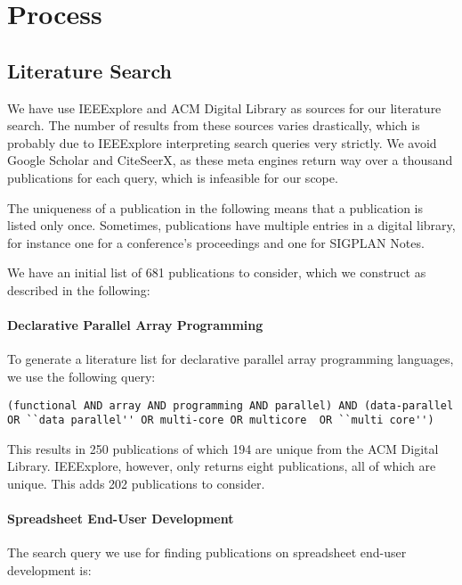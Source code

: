 \documentclass[a4paper]{article}
\begin{document}
\section{Process}
\label{sec:process}

\subsection{Literature Search}
\label{sec:literature-search}

We have use IEEExplore and ACM Digital Library as sources for our
literature search. The number of results from these sources varies
drastically, which is probably due to IEEExplore interpreting search
queries very strictly. We avoid Google Scholar and CiteSeerX, as these
meta engines return way over a thousand publications for each query,
which is infeasible for our scope.

The uniqueness of a publication in the following means that a
publication is listed only once. Sometimes, publications have multiple
entries in a digital library, for instance one for a conference's
proceedings and one for SIGPLAN Notes.

We have an initial list of 681 publications to consider, which we
construct as described in the following:

\paragraph{Declarative Parallel Array Programming}

To generate a literature list for declarative parallel array
programming languages, we use the following query:

\begin{lstlisting}
(functional AND array AND programming AND parallel) AND (data-parallel OR ``data parallel'' OR multi-core OR multicore  OR ``multi core'')
\end{lstlisting}

\noindent This results in 250 publications of which 194 are unique from the ACM
Digital Library. IEEExplore, however, only returns eight publications,
all of which are unique. This adds 202 publications to consider.

\paragraph{Spreadsheet End-User Development}

The search query we use for finding publications on spreadsheet
end-user development is:
\end{document}
